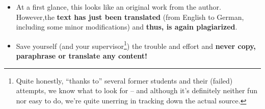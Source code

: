 \documentclass[11pt,a4paper]{article}
\begin{document}
\begin{badexample}
  \begin{figure}[H]
    \centering%
    {%
      \setlength{\fboxsep}{0pt}%
      \setlength{\fboxrule}{2pt}%
    }
  \end{figure}
  \begin{itemize}
    \item At a first glance, this looks like an original work from the author.
    However,the \textbf{text has just been translated} (from English to German, including some minor modifications) and \textbf{thus, is again plagiarized}.
    \item Save yourself (and your supervisor\footnote{Quite honestly, ``thanks to'' several former students and their (failed) attempts, we know what to look for -- and although it's definitely neither fun nor easy to do, we're quite unerring in tracking down the actual source.}) the trouble and effort and \textbf{never copy, paraphrase or translate any content!}
  \end{itemize}
\end{badexample}
\end{document}
